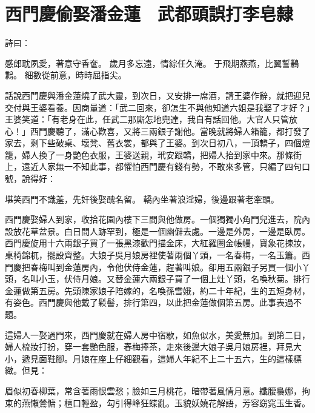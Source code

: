 %

\chapter{西門慶偷娶潘金蓮　武都頭誤打李皂隸}

\begin{showcontents}{}



詩曰：

感郎耽夙愛，著意守香奩。
歲月多忘遠，情綜任久淹。
于飛期燕燕，比翼誓鶼鶼。
細數從前意，時時屈指尖。

話說西門慶與潘金蓮燒了武大靈，到次日，又安排一席酒，請王婆作辭，就把迎兒交付與王婆看養。因商量道：「武二回來，卻怎生不與他知道六姐是我娶了才好？」王婆笑道：「有老身在此，任武二那廝怎地兜達，我自有話回他。大官人只管放心！」西門慶聽了，滿心歡喜，又將三兩銀子謝他。當晚就將婦人箱籠，都打發了家去，剩下些破桌、壞凳、舊衣裳，都與了王婆。到次日初八，一頂轎子，四個燈籠，婦人換了一身艷色衣服，王婆送親，玳安跟轎，把婦人抬到家中來。那條街上，遠近人家無一不知此事，都懼怕西門慶有錢有勢，不敢來多管，只編了四句口號，說得好：

堪笑西門不識羞，先奸後娶醜名留。
轎內坐著浪淫婦，後邊跟著老牽頭。

西門慶娶婦人到家，收拾花園內樓下三間與他做房。一個獨獨小角門兒進去，院內設放花草盆景。白日間人跡罕到，極是一個幽僻去處。一邊是外房，一邊是臥房。西門慶旋用十六兩銀子買了一張黑漆歡門描金床，大紅羅圈金帳幔，寶象花揀妝，桌椅錦杌，擺設齊整。大娘子吳月娘房裡使著兩個丫頭，一名春梅，一名玉簫。西門慶把春梅叫到金蓮房內，令他伏侍金蓮，趕著叫娘。卻用五兩銀子另買一個小丫頭，名叫小玉，伏侍月娘。又替金蓮六兩銀子買了一個上灶丫頭，名喚秋菊。排行金蓮做第五房。先頭陳家娘子陪嫁的，名喚孫雪娥，約二十年紀，生的五短身材，有姿色。西門慶與他戴了鬏髻，排行第四，以此把金蓮做個第五房。此事表過不題。

這婦人一娶過門來，西門慶就在婦人房中宿歇，如魚似水，美愛無加。到第二日，婦人梳妝打扮，穿一套艷色服，春梅捧茶，走來後邊大娘子吳月娘房裡，拜見大小，遞見面鞋腳。月娘在座上仔細觀看，這婦人年紀不上二十五六，生的這樣標緻。但見：

眉似初春柳葉，常含著雨恨雲愁；臉如三月桃花，暗帶著風情月意。纖腰裊娜，拘束的燕懶鶯慵；檀口輕盈，勾引得峰狂蝶亂。玉貌妖嬈花解語，芳容窈窕玉生香。


\end{showcontents}
